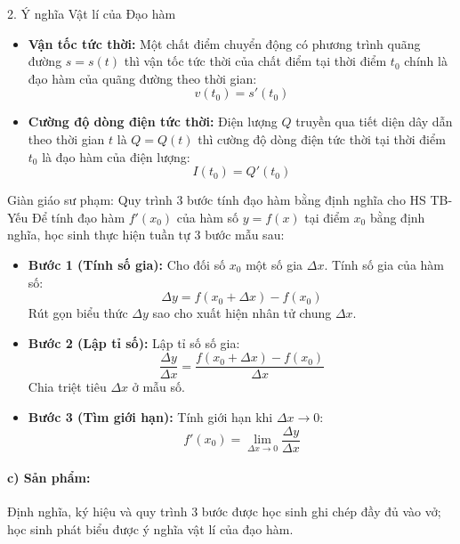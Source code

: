 \documentclass[12pt, a4paper]{article}
\begin{document}
\begin{pedabox}{2. Ý nghĩa Vật lí của Đạo hàm}
\begin{itemize}[leftmargin=0.5cm]
    \item \textbf{Vận tốc tức thời:} Một chất điểm chuyển động có phương trình quãng đường $s = s(t)$ thì vận tốc tức thời của chất điểm tại thời điểm $t_0$ chính là đạo hàm của quãng đường theo thời gian:
    \begin{equation}
        v(t_0) = s'(t_0)
    \end{equation}
    \item \textbf{Cường độ dòng điện tức thời:} Điện lượng $Q$ truyền qua tiết diện dây dẫn theo thời gian $t$ là $Q = Q(t)$ thì cường độ dòng điện tức thời tại thời điểm $t_0$ là đạo hàm của điện lượng:
    \begin{equation}
        I(t_0) = Q'(t_0)
    \end{equation}
\end{itemize}
\end{pedabox}

\begin{scaffoldbox}{Giàn giáo sư phạm: Quy trình 3 bước tính đạo hàm bằng định nghĩa cho HS TB-Yếu}
Để tính đạo hàm $f'(x_0)$ của hàm số $y = f(x)$ tại điểm $x_0$ bằng định nghĩa, học sinh thực hiện tuần tự 3 bước mẫu sau:
\begin{itemize}[leftmargin=0.5cm]
    \item \textbf{Bước 1 (Tính số gia):} Cho đối số $x_0$ một số gia $\Delta x$. Tính số gia của hàm số:
    $$\Delta y = f(x_0 + \Delta x) - f(x_0)$$
    Rút gọn biểu thức $\Delta y$ sao cho xuất hiện nhân tử chung $\Delta x$.
    \item \textbf{Bước 2 (Lập tỉ số):} Lập tỉ số số gia:
    $$\dfrac{\Delta y}{\Delta x} = \dfrac{f(x_0 + \Delta x) - f(x_0)}{\Delta x}$$
    Chia triệt tiêu $\Delta x$ ở mẫu số.
    \item \textbf{Bước 3 (Tìm giới hạn):} Tính giới hạn khi $\Delta x \to 0$:
    $$f'(x_0) = \lim_{\Delta x \to 0} \dfrac{\Delta y}{\Delta x}$$
\end{itemize}
\end{scaffoldbox}

\paragraph{c) Sản phẩm:} Định nghĩa, ký hiệu và quy trình 3 bước được học sinh ghi chép đầy đủ vào vở; học sinh phát biểu được ý nghĩa vật lí của đạo hàm.
\end{document}
